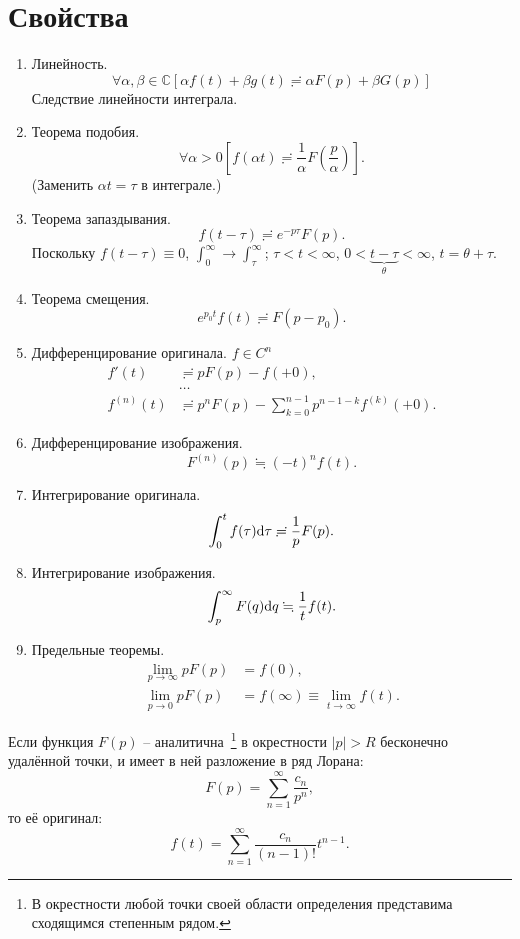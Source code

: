 \documentclass[12pt]{report}
\renewcommand{\C}{\mathbb C}
\begin{document}
\section{Свойства~\cite{Dubkov:Lecture}}
\begin{enumerate}
	\item Линейность.
	\[
	\forall\alpha,\beta\in\C\left[\alpha f(t)+\beta g(t) \risingdotseq \alpha F(p) + \beta G(p)\right]
	\]
	Следствие линейности интеграла.
	\item Теорема подобия.
	\[
	\forall\alpha>0 \left[f(\alpha t) \risingdotseq \frac 1\alpha F\left(\frac p\alpha\right) \right].
	\]
	(Заменить $\alpha t = \tau$ в интеграле.)
	\item Теорема запаздывания.\label{itm:prop-offset}
	\[
	f(t-\tau) \risingdotseq e^{-p\tau} F(p).
	\]
	Поскольку $f(t-\tau) \equiv 0$, $\int_0^\infty \to \int_\tau^\infty$; $\tau < t < \infty$, 
	$0 < \underbrace{t-\tau}_{\theta} < \infty$, $t = \theta + \tau$.
	\item Теорема смещения.
	\[
	e^{p_0t} f(t) \risingdotseq F(p-p_0).
	\]
	\item Дифференцирование оригинала. $f\in C^n$ \label{itm:prop-diff-original}
	\begin{align*}
	f'(t) &\risingdotseq p F(p) - f(+0), \\
	&\dots \\
	f^{(n)}(t) &\risingdotseq p^nF(p) -\sum_{k=0}^{n-1}p^{n-1-k}f^{(k)}(+0).
	\end{align*}
	\item Дифференцирование изображения.
	\[
	F^{(n)}(p) \fallingdotseq (-t)^nf(t).
	\]
	\item  Интегрирование оригинала.
	\[
	\int_0^t f(\tau)\mathrm d\tau \risingdotseq \frac 1p F(p).
	\]
	\item Интегрирование изображения.
	\[
	\int_p^\infty F(q)\mathrm d q \fallingdotseq \frac 1t f(t).
	\]
	\item Предельные теоремы.
	\begin{align*}
		\lim\limits_{p\to \infty} pF(p) &= f(0),\\
		\lim\limits_{p\to0} pF(p) &= f(\infty) \equiv \lim_{t\to\infty}f(t).
	\end{align*}
\end{enumerate}

\begin{thm}
	Если функция $F(p)$ -- аналитична~\footnote{В окрестности любой точки своей области определения представима сходящимся степенным рядом.} в окрестности $|p|>R$ бесконечно удалённой точки, и имеет в ней разложение в ряд Лорана:
	\[
	F(p) = \sum_{n=1}^{\infty}\frac{c_n}{p^n},
	\]
	то её оригинал:
	\[
	f(t) = \sum_{n=1}^{\infty}\frac{c_n}{(n-1)!}t^{n-1}.
	\]
\end{thm}
\end{document}
